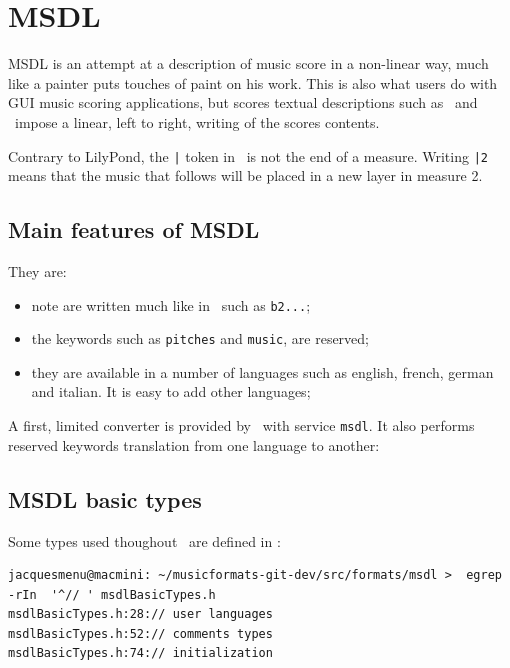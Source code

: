 
\chapter{MSDL}


MSDL is an attempt at a description of music score in a non-linear way, much like a painter puts touches of paint on his work. This is also what users do with GUI music scoring applications, but scores textual descriptions such as \lily\ and \guido\ impose a linear, left to right, writing of the scores contents.

Contrary to LilyPond, the {\tt |} token in \msdlLang\ is not the end of a measure. Writing {\tt |2} means that the music that follows will be placed in a new layer in measure 2.


\section{Main features of MSDL}

They are:
\begin{itemize}
\item note are written much like in \lily\, such as {\tt b2...};
\item the keywords such as {\tt pitches} and {\tt music}, are reserved;
\item they are available in a number of languages such as english, french, german and italian. It is easy to add other languages;
\end{itemize}

A first, limited converter is provided by \mf\, with service {\tt msdl}. It also performs reserved keywords translation from one language to another:


\section{MSDL basic types}\label{MSDL basic types}

Some types used thoughout \msrRepr\ are defined in :%
\begin{lstlisting}[language=Terminal]
jacquesmenu@macmini: ~/musicformats-git-dev/src/formats/msdl >  egrep -rIn  '^// ' msdlBasicTypes.h
msdlBasicTypes.h:28:// user languages
msdlBasicTypes.h:52:// comments types
msdlBasicTypes.h:74:// initialization
\end{lstlisting}


